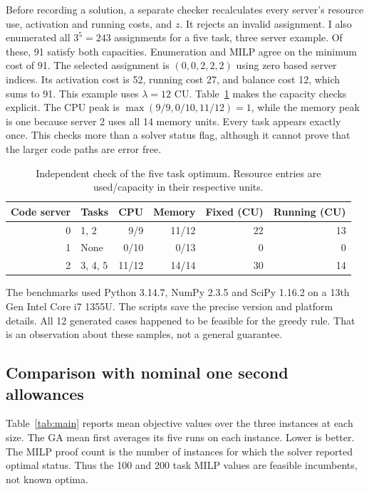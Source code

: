 \documentclass[10pt,a4paper]{article}
\begin{document}
Before recording a solution, a separate checker recalculates every server's
resource use, activation and running costs, and $z$. It rejects an invalid
assignment. I also enumerated all $3^5=243$ assignments for a five task, three
server example. Of these, 91 satisfy both capacities. Enumeration and MILP agree
on the minimum cost of 91. The selected assignment is $(0,0,2,2,2)$ using zero
based server indices. Its activation cost is 52, running cost 27, and balance
cost 12, which sums to 91. This example uses $\lambda=12$ CU.
Table~\ref{tab:small} makes the capacity checks explicit. The CPU peak is
$\max(9/9,0/10,11/12)=1$, while the memory peak is one because server 2
uses all 14 memory units. Every task appears exactly once. This checks more
than a solver status flag, although
it cannot prove that the larger code paths are error free.

\begin{table}[htbp]
\centering
\caption{Independent check of the five task optimum. Resource entries are used/capacity in their respective units.}
\label{tab:small}
\small
\begin{tabular}{rlrrrr}
\toprule
Code server & Tasks & CPU & Memory & Fixed (CU) & Running (CU) \\
\midrule
0 & 1, 2 & 9/9 & 11/12 & 22 & 13 \\
1 & None & 0/10 & 0/13 & 0 & 0 \\
2 & 3, 4, 5 & 11/12 & 14/14 & 30 & 14 \\
\bottomrule
\end{tabular}
\end{table}

The benchmarks used Python 3.14.7, NumPy 2.3.5 and SciPy 1.16.2 on a 13th Gen
Intel Core i7 1355U. The scripts save the precise version and platform details.
All 12 generated cases happened to be feasible for the greedy rule. That is an
observation about these samples, not a general guarantee.

\subsection{Comparison with nominal one second allowances}

Table~\ref{tab:main} reports mean objective values over the three instances at
each size. The GA mean first averages its five runs on each instance. Lower is
better. The MILP proof count is the number of instances for which the solver
reported optimal status. Thus the 100 and 200 task MILP values are feasible
incumbents, not known optima.
\end{document}
